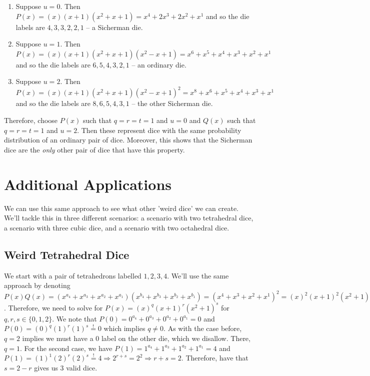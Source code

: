 \documentclass[12pt]{report}
\begin{document}
\begin{enumerate}
\item Suppose $u=0$. Then $P(x)=(x)(x+1)(x^{2}+x+1)=x^{4}+2x^{3}+2x^{2}+x^{1}$ and so the die labels are $4,3,3,2,2,1$ -- a Sicherman die.
\item Suppose $u=1$. Then $P(x)=(x)(x+1)(x^{2}+x+1)(x^{2}-x+1)=x^{6}+x^{5}+x^{4}+x^{3}+x^{2}+x^{1}$ and so the die labels are $6,5,4,3,2,1$ -- an ordinary die.
\item Suppose $u=2$. Then $P(x)=(x)(x+1)(x^{2}+x+1)(x^{2}-x+1)^{2}=x^{8}+x^{6}+x^{5}+x^{4}+x^{3}+x^{1}$ and so the die labels are $8,6,5,4,3,1$ -- the other Sicherman die.
\end{enumerate}

Therefore, choose $P(x)$ such that $q=r=t=1$ and $u=0$ and $Q(x)$ such that $q=r=t=1$ and $u=2$. Then these
represent dice with the same probability distribution of an ordinary pair of dice. Moreover, this shows that
the Sicherman dice are the \textit{only} other pair of dice that have this property.

\section*{Additional Applications}
We can use this same approach to see what other 'weird dice' we can create. We'll tackle this in three
different scenarios: a scenario with two tetrahedral dice, a scenario with three cubic dice, and a scenario
with two octahedral dice.

\subsection*{Weird Tetrahedral Dice}
We start with a pair of tetrahedrons labelled $1,2,3,4$. We'll use the same approach by denoting
$P(x)Q(x)=(x^{a_{4}}+x^{a_{3}}+x^{a_{2}}+x^{a_{1}})
(x^{b_{4}}+x^{b_{3}}+x^{b_{2}}+x^{b_{1}})=(x^{4}+x^{3}+x^{2}+x^{1})^{2}=(x)^{2}(x+1)^{2}(x^{2}+1)^{2}$.
Therefore, we need to solve for $P(x)=(x)^{q}(x+1)^{r}(x^{2}+1)^{s}$ for $q,r,s \in \{0,1,2\}$. We note that
$P(0)=0^{a_{4}}+0^{a_{3}}+0^{a_{2}}+0^{a_{1}}=0$ and $P(0)=(0)^{q}(1)^{r}(1)^{s} \stackrel{!}{=} 0$ which
implies $q \neq 0$. As with the case before, $q=2$ implies we must have a 0 label on the other die, which we
disallow. There, $q=1$. For the second case, we have $P(1)=1^{a_{4}}+1^{a_{3}}+1^{a_{2}}+1^{a_{1}}=4$ and
$P(1)=(1)^{1}(2)^{r}(2)^{s} \stackrel{!}{=} 4 \Rightarrow 2^{r+s}=2^{2} \Rightarrow r+s=2$. Therefore, have
that $s=2-r$ gives us 3 valid dice. 
\end{document}
